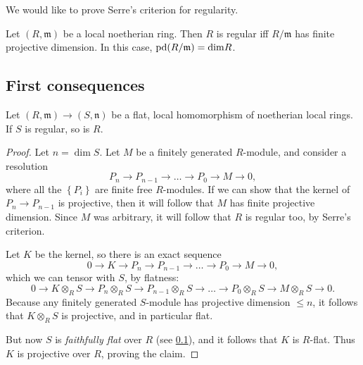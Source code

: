  We would like to prove
Serre's
criterion for regularity.

\begin{theorem}
Let $(R, \mathfrak{m})$ be a local noetherian ring. Then $R$ is
regular iff
$R/\mathfrak{m}$ has finite projective dimension. In this case,
$\mathrm{pd}(R/\mathfrak{m}) = \mathrm{dim} R$.
\end{theorem}



\subsection{First consequences}


\begin{proposition} 
Let $(R, \mathfrak{m}) \to (S, \mathfrak{n})$ be a flat, local homomorphism of noetherian local
rings. If $S$ is regular, so is $R$.
\end{proposition} 
\begin{proof} 
Let $n = \dim S$.
Let $M$ be a finitely generated $R$-module, and consider a resolution
\[ P_n \to P_{n-1} \to \dots \to P_0 \to M \to 0,  \]
where all the $\left\{P_i\right\}$ are finite free $R$-modules. If we can show
that the kernel of $P_n \to P_{n-1}$ is projective, then it will follow that
$M$ has finite projective dimension. Since $M$ was arbitrary, it will follow
that $R$ is regular too, by Serre's criterion.

Let $K$ be the kernel, so there is an exact sequence
\[ 0 \to K \to  P_n \to P_{n-1} \to \dots \to P_0 \to M \to 0, \]
which we can tensor with $S$, by flatness:
\[ 0 \to K \otimes_R S \to  P_n \otimes_R S  \to P_{n-1} \otimes_R S \to \dots
\to P_0 \otimes_R S  \to M \otimes_R S\to 0. \]
Because any finitely generated $S$-module has projective dimension $\leq n$, it
follows that $K \otimes_R S$ is projective, and in particular flat.

But now $S$ is \emph{faithfully flat} over $R$ (see \cref{}), and it follows
that $K $ is $R$-flat. Thus $K$ is projective over $R$, proving the claim. 
\end{proof} 

